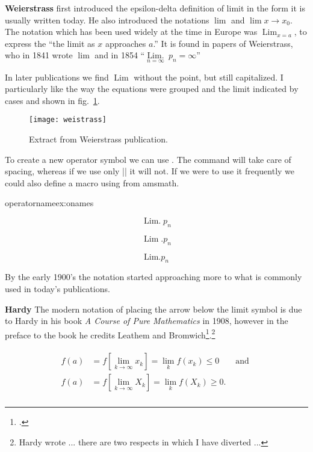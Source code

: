 {\textbf{Weierstrass} first introduced the epsilon-delta definition of limit in the form it is usually written today. He also introduced the notations $\lim$ and $\lim x\rightarrow x_0$. The notation which has been used widely at the time in Europe was
$\operatorname{Lim}_{x=a}$, to express the \enquote{the limit as $x$ approaches $a$.} It is found in papers of Weierstrass, who in 1841 wrote $\lim$ and in 1854 \enquote{$\underset{n=\infty}{\operatorname{Lim.}}\:p_n = \infty $}

In later publications we find $\operatorname{Lim}$ without the point, but still capitalized. I particularly like the way the equations were grouped and the limit indicated by cases and shown in fig.~\ref{weis}.

\begin{figure}[htbp]
\centering
\texttt{[image: weistrass]}
\caption{Extract from Weierstrass publication.}
\label{weis}

\end{figure}

To create a new operator symbol we can use . The command will take care of spacing, whereas if we use only
|\mathrm| it will not. If we were to use it frequently we could also define a macro using  from amsmath. 

\begin{texexample}{operatorname}{ex:onames}

$$\operatorname{Lim.}p_n$$

$$\operatorname{Lim}.p_n$$

$$\mathrm{Lim.}p_n$$ 
\end{texexample}

By the early 1900's the notation started approaching more to what is commonly used in today's publications.

\textbf{Hardy} The modern notation of placing the arrow below the limit symbol is due to Hardy in his book \emph{A Course of Pure Mathematics} in 1908, however in the preface to the book he credits Leathem and Bromwich\footcite{bromwich}.\footnote{Hardy wrote ... there are two respects in which I have diverted ...} 


\begin{gather}
\begin{aligned}
f(a) &= f\left[\lim_{k\rightarrow\infty} x_k \right]=\lim_{k} f(x_k)\le 0 & \text{ and }\\
f(a) &= f\left[\lim_{k\rightarrow\infty} X_k \right]=\lim_{k} f(X_k)\ge 0. & \\  
\end{aligned}
\end{gather}

}

